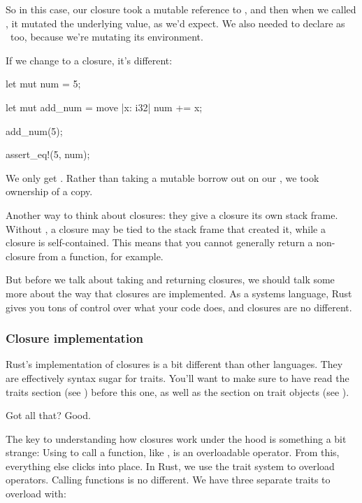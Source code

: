 So in this case, our closure took a mutable reference to , and then when we called , it mutated the underlying 
value, as we'd expect. We also needed to declare  as \mut\ too, because we're mutating its environment.

\blank

If we change to a  closure, it's different:

\begin{rustc}
let mut num = 5;

{
    let mut add_num = move |x: i32| num += x;

    add_num(5);
}

assert_eq!(5, num);
\end{rustc}

We only get . Rather than taking a mutable borrow out on our , we took ownership of a copy.

\blank

Another way to think about  closures: they give a closure its own stack frame. Without , a closure may be tied 
to the stack frame that created it, while a  closure is self-contained. This means that you cannot generally return a non- 
closure from a function, for example.

\blank

But before we talk about taking and returning closures, we should talk some more about the way that closures are implemented. As a systems 
language, Rust gives you tons of control over what your code does, and closures are no different.

\subsubsection*{Closure implementation}

Rust's implementation of closures is a bit different than other languages. They are effectively syntax sugar for traits. You'll want to 
make sure to have read the traits section (see ) before this one, as well as the section on 
trait objects (see ).

\blank

Got all that? Good.

\blank

The key to understanding how closures work under the hood is something a bit strange: Using \code{()} to call a function, like , 
is an overloadable operator. From this, everything else clicks into place. In Rust, we use the trait system to overload operators. Calling 
functions is no different. We have three separate traits to overload with:

